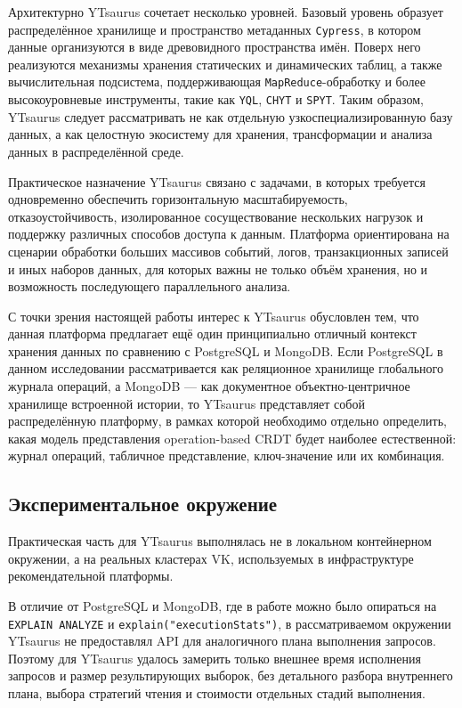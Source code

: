 \documentclass[a4paper,14pt]{extarticle}
\def\makefirstuc#1{#1}%
\def\normalsize{}%
\newcommand{\mysubsection}[1]{%
    \subsection{\normalsize\makefirstuc{#1}}
}
\begin{document}
Архитектурно YTsaurus сочетает несколько уровней. Базовый уровень образует
распределённое хранилище и пространство метаданных \texttt{Cypress}, в котором
данные организуются в виде древовидного пространства имён. Поверх него
реализуются механизмы хранения статических и динамических таблиц, а также
вычислительная подсистема, поддерживающая \texttt{MapReduce}-обработку и более
высокоуровневые инструменты, такие как \texttt{YQL}, \texttt{CHYT} и
\texttt{SPYT}. Таким образом, YTsaurus следует рассматривать не как отдельную
узкоспециализированную базу данных, а как целостную экосистему для хранения,
трансформации и анализа данных в распределённой среде.

Практическое назначение YTsaurus связано с задачами, в которых требуется
одновременно обеспечить горизонтальную масштабируемость, отказоустойчивость,
изолированное сосуществование нескольких нагрузок и поддержку различных
способов доступа к данным. Платформа ориентирована на сценарии обработки
больших массивов событий, логов, транзакционных записей и иных наборов данных,
для которых важны не только объём хранения, но и возможность последующего
параллельного анализа.

С точки зрения настоящей работы интерес к YTsaurus обусловлен тем, что данная
платформа предлагает ещё один принципиально отличный контекст хранения данных
по сравнению с PostgreSQL и MongoDB. Если PostgreSQL в данном исследовании
рассматривается как реляционное хранилище глобального журнала операций, а
MongoDB --- как документное объектно-центричное хранилище встроенной истории,
то YTsaurus представляет собой распределённую платформу, в рамках которой
необходимо отдельно определить, какая модель представления operation-based
CRDT будет наиболее естественной: журнал операций, табличное представление,
ключ-значение или их комбинация.

\mysubsection{Экспериментальное окружение}

Практическая часть для YTsaurus выполнялась не в локальном контейнерном
окружении, а на реальных кластерах VK, используемых в инфраструктуре
рекомендательной платформы.

В отличие от PostgreSQL и MongoDB, где в работе можно было
опираться на \texttt{EXPLAIN ANALYZE} и \texttt{explain("executionStats")},
в рассматриваемом окружении YTsaurus не предоставлял API для аналогичного
плана выполнения запросов. Поэтому для YTsaurus удалось замерить только
внешнее время исполнения запросов и размер результирующих выборок, без
детального разбора внутреннего плана, выбора стратегий чтения и стоимости
отдельных стадий выполнения.
\end{document}
